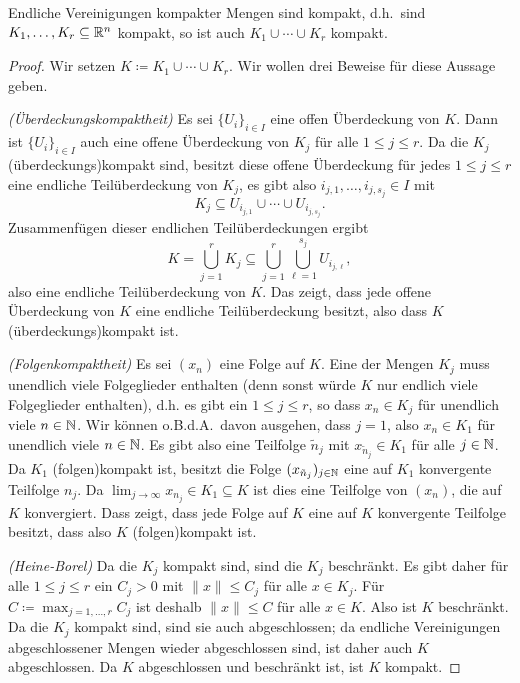 \documentclass[a4paper,10pt]{article}
\begin{document}
\begin{lem}
 Endliche Vereinigungen kompakter Mengen sind kompakt, d.h.\ sind $K_1, \dotsc, K_r \subseteq \mathbb{R}^n$ kompakt, so ist auch $K_1 \cup \dotsb \cup K_r$ kompakt.
\end{lem}
\begin{proof}
 Wir setzen $K \coloneqq K_1 \cup \dotsb \cup K_r$. Wir wollen drei Beweise für diese Aussage geben.
 
 \emph{(Überdeckungskompaktheit)} Es sei $\{U_i\}_{i \in I}$ eine offen Überdeckung von $K$. Dann ist $\{U_i\}_{i \in I}$ auch eine offene Überdeckung von $K_j$ für alle $1 \leq j \leq r$. Da die $K_j$ (überdeckungs)kompakt sind, besitzt diese offene Überdeckung für jedes $1 \leq j \leq r$ eine endliche Teilüberdeckung von $K_j$, es gibt also $i_{j,1}, \dotsc, i_{j,s_j} \in I$ mit
 \[
  K_j \subseteq U_{i_{j,1}} \cup \dotsb \cup U_{i_{j,s_j}}.
 \]
 Zusammenfügen dieser endlichen Teilüberdeckungen ergibt
 \[
  K
  = \bigcup_{j=1}^r K_j
  \subseteq \bigcup_{j=1}^r \bigcup_{\ell=1}^{s_j} U_{i_{j,\ell}},
 \]
 also eine endliche Teilüberdeckung von $K$. Das zeigt, dass jede offene Überdeckung von $K$ eine endliche Teilüberdeckung besitzt, also dass $K$ (über\-deck\-ungs)kom\-pakt ist.
 
 \emph{(Folgenkompaktheit)} Es sei $(x_n)$ eine Folge auf $K$. Eine der Mengen $K_j$ muss unendlich viele Folgeglieder enthalten (denn sonst würde $K$ nur endlich viele Folgeglieder enthalten), d.h. es gibt ein $1 \leq j \leq r$, so dass $x_n \in K_j$ für unendlich viele $n \in \mathbb{N}$. Wir können o.B.d.A.\ davon ausgehen, dass $j = 1$, also $x_n \in K_1$ für unendlich viele $n \in \mathbb{N}$. Es gibt also eine Teilfolge $\tilde{n}_j$ mit $x_{\tilde{n}_j} \in K_1$ für alle $j \in \mathbb{N}$. Da $K_1$ (folgen)kompakt ist, besitzt die Folge $(x_{\tilde{n}_j})_{j \in \mathbb{N}}$ eine auf $K_1$ konvergente Teilfolge $n_j$. Da $\lim_{j \to \infty} x_{n_j} \in K_1 \subseteq K$ ist dies eine Teilfolge von $(x_n)$, die auf $K$ konvergiert. Dass zeigt, dass jede Folge auf $K$ eine auf $K$ konvergente Teilfolge besitzt, dass also $K$ (folgen)kompakt ist.
 
 \emph{(Heine-Borel)} Da die $K_j$ kompakt sind, sind die $K_j$ beschränkt. Es gibt daher für alle $1 \leq j \leq r$ ein $C_j > 0$ mit $\|x\| \leq C_j$ für alle $x \in K_j$. Für $C \coloneqq \max_{j=1,\dotsc,r} C_j$ ist deshalb $\|x\| \leq C$ für alle $x \in K$. Also ist $K$ beschränkt. Da die $K_j$ kompakt sind, sind sie auch abgeschlossen; da endliche Vereinigungen abgeschlossener Mengen wieder abgeschlossen sind, ist daher auch $K$ abgeschlossen. Da $K$ abgeschlossen und beschränkt ist, ist $K$ kompakt.
\end{proof}
\end{document}
